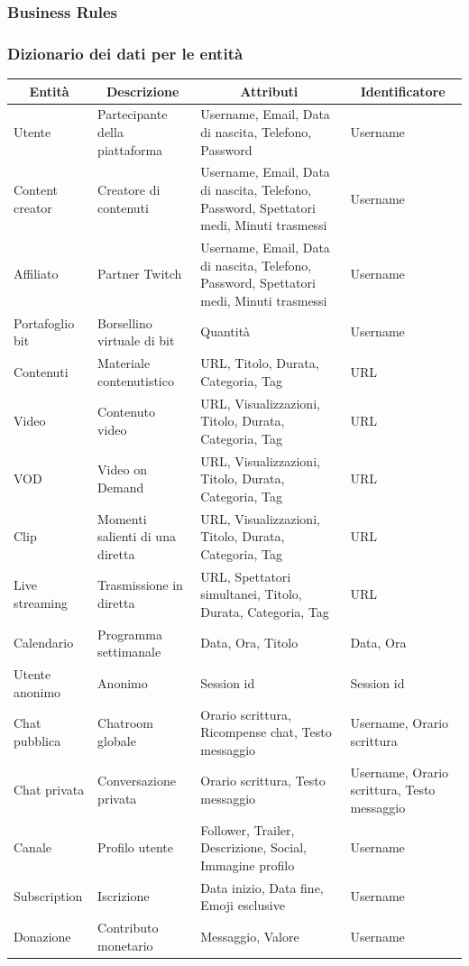 \newpage
\setlength{\parskip}{0.5em}
\begin{landscape}
\subsubsection{Business Rules}
\subsubsection*{Dizionario dei dati per le entità}
\begin{center}
\begin{tabular}{ |p{5cm}|p{4cm}|p{7cm}|p{5cm}|  }
 \hline
 \multicolumn{1}{|c|}{\textbf{Entità}} 
 & \multicolumn{1}{|c|}{\textbf{Descrizione}} 
 & \multicolumn{1}{|c|}{\textbf{Attributi}}
 & \multicolumn{1}{|c|}{\textbf{Identificatore}}\\
 \hline
 Utente & Partecipante della piattaforma & Username, Email, Data di nascita, Telefono, Password & Username\\
 \hline
 Content creator & Creatore di contenuti & Username, Email, Data di nascita, Telefono, Password, Spettatori medi, Minuti trasmessi & Username \\
 \hline
 Affiliato & Partner Twitch & Username, Email, Data di nascita, Telefono, Password, Spettatori medi, Minuti trasmessi & Username\\
 \hline
 Portafoglio bit & Borsellino virtuale di bit & Quantità & Username\\
 \hline
 Contenuti & Materiale contenutistico & URL, Titolo, Durata, Categoria, Tag & URL \\
 \hline
  Video & Contenuto video & URL, Visualizzazioni, Titolo, Durata, Categoria, Tag & URL \\
 \hline
 VOD & Video on Demand & URL, Visualizzazioni, Titolo, Durata, Categoria, Tag & URL \\
 \hline
 Clip & Momenti salienti di una diretta & URL, Visualizzazioni, Titolo, Durata, Categoria, Tag & URL\\
 \hline
 Live streaming & Trasmissione in diretta & URL, Spettatori simultanei, Titolo, Durata, Categoria, Tag & URL \\
 \hline
 Calendario & Programma settimanale & Data, Ora, Titolo & Data, Ora\\
 \hline
 Utente anonimo & Anonimo & Session id & Session id\\
 \hline 
 Chat pubblica & Chatroom globale & Orario scrittura, Ricompense chat, Testo messaggio & Username, Orario scrittura\\
 \hline
 Chat privata & Conversazione privata & Orario scrittura, Testo messaggio & Username, Orario scrittura, Testo messaggio\\
 \hline
 Canale & Profilo utente & Follower, Trailer, Descrizione, Social, Immagine profilo & Username\\
 \hline 
 Subscription & Iscrizione & Data inizio, Data fine, Emoji esclusive & Username\\
 \hline
 Donazione & Contributo monetario & Messaggio, Valore & Username\\
 \hline
\end{tabular}
\end{center}
\end{landscape}
